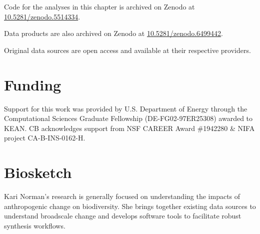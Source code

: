 \documentclass{article}
\begin{document}
Code for the analyses in this chapter is archived on Zenodo at
\href{https://doi.org/10.5281/zenodo.5514334}{10.5281/zenodo.5514334}.

Data products are also archived on Zenodo at
\href{https://doi.org/10.5281/zenodo.6499442}{10.5281/zenodo.6499442}.

Original data sources are open access and available at their respective
providers.

\hypertarget{funding}{%
\section{Funding}\label{funding}}

Support for this work was provided by U.S. Department of Energy through
the Computational Sciences Graduate Fellowship (DE-FG02-97ER25308)
awarded to KEAN. CB acknowledges support from NSF CAREER Award \#1942280
\& NIFA project CA-B-INS-0162-H.

\hypertarget{biosketch}{%
\section{Biosketch}\label{biosketch}}

Kari Norman's research is generally focused on understanding the impacts
of anthropogenic change on biodiversity. She brings together existing
data sources to understand broadscale change and develops software tools
to facilitate robust synthesis workflows.



\end{document}
